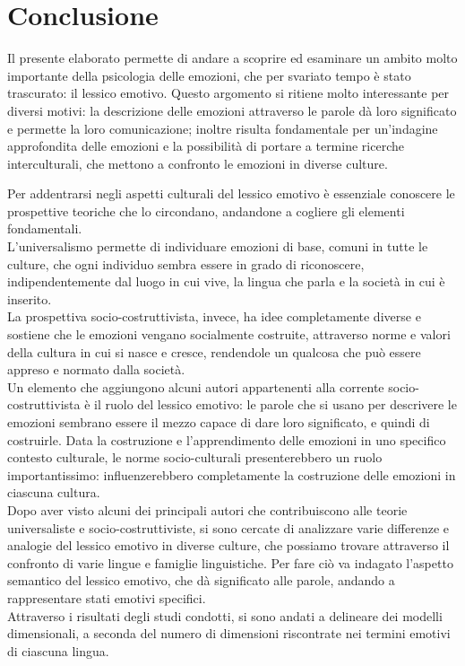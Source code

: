 \clearpage
\chapter{Conclusione}
Il presente elaborato permette di andare a scoprire ed esaminare un ambito molto importante della psicologia delle emozioni, che per svariato tempo è stato trascurato: il lessico emotivo. Questo argomento si ritiene molto interessante per diversi motivi: la descrizione delle emozioni attraverso le parole dà loro significato e permette la loro comunicazione; inoltre risulta fondamentale per un'indagine approfondita delle emozioni e la possibilità di portare a termine ricerche interculturali, che mettono a confronto le emozioni in diverse culture. 

Per addentrarsi negli aspetti culturali del lessico emotivo è essenziale conoscere le prospettive teoriche che lo circondano, andandone a cogliere gli elementi fondamentali. \\
L'universalismo permette di individuare emozioni di base, comuni in tutte le culture, che ogni individuo sembra essere in grado di riconoscere, indipendentemente dal luogo in cui vive, la lingua che parla e la società in cui è inserito. \\
La prospettiva socio-costruttivista, invece, ha idee completamente diverse e sostiene che le emozioni vengano socialmente costruite, attraverso norme e valori della cultura in cui si nasce e cresce, rendendole un qualcosa che può essere appreso e normato dalla società. \\
Un elemento che aggiungono alcuni autori appartenenti alla corrente socio-costruttivista è il ruolo del lessico emotivo: le parole che si usano per descrivere le emozioni sembrano essere il mezzo capace di dare loro significato, e quindi di costruirle. Data la costruzione e l'apprendimento delle emozioni in uno specifico contesto culturale, le norme socio-culturali presenterebbero un ruolo importantissimo: influenzerebbero completamente la costruzione delle emozioni in ciascuna cultura.\\
Dopo aver visto alcuni dei principali autori che contribuiscono alle teorie universaliste e socio-costruttiviste, si sono cercate di analizzare varie differenze e analogie del lessico emotivo in diverse culture, che possiamo trovare attraverso il confronto di varie lingue e famiglie linguistiche. Per fare ciò va indagato l'aspetto semantico del lessico emotivo, che dà significato alle parole, andando a rappresentare stati emotivi specifici. \\
Attraverso i risultati degli studi condotti, si sono andati a delineare dei modelli dimensionali, a seconda del numero di dimensioni riscontrate nei termini emotivi di ciascuna lingua. 

